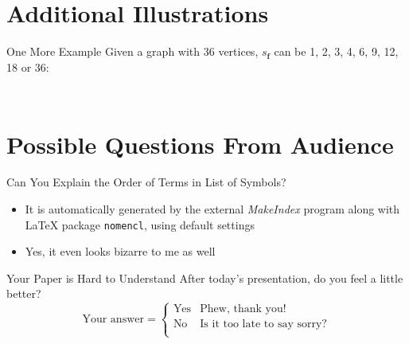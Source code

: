 

\section*{Additional Illustrations}

\begin{frame}{One More Example}
	Given a graph with 36 vertices, \(s_{\textbf{f}}\) can be 1, 2, 3, 4, 6, 9, 12, 18 or 36:
	\begin{columns}[c]
		\begin{column}{0.5\textwidth}
			\begin{figure}[ht]
				\centering
				
			\end{figure}
		\end{column}

		\begin{column}{0.5\textwidth}
			\centering
			\only<12-14>{\(6 \leq s_{\textbf{f}} \leq 9\)}
		\end{column}
	\end{columns}
\end{frame}

\section*{Possible Questions From Audience}

\begin{frame}{Can You Explain the Order of Terms in List of Symbols?}
	\begin{itemize}
		\item It is automatically generated by the external \textit{MakeIndex} program along with \LaTeX{} package \texttt{nomencl}, using default settings
		\item Yes, it even looks bizarre to me as well
	\end{itemize}
\end{frame}

\begin{frame}{Your Paper is Hard to Understand \textellipsis}
	After today's presentation, do you feel a little better?
	\[
		\text{Your answer} =
		\begin{cases}
			\text{Yes} & \text{Phew, thank you!} \\
			\text{No} & \text{Is it too late to say sorry?} \\
		\end{cases}
	\]
\end{frame}